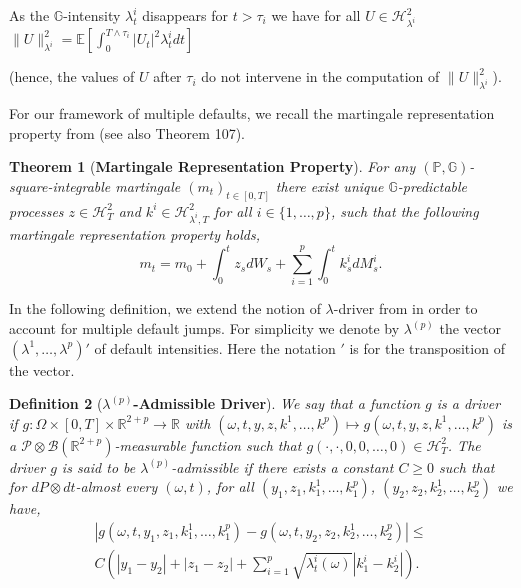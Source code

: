 \documentclass[11pt,a4paper]{article}
\numberwithin{equation}{section}
\theoremstyle{newPlain}
\newtheorem{theorem}{Theorem}[section]
\theoremstyle{newDefinition}
\newtheorem{definition}[theorem]{Definition}
\theoremstyle{newRemark}
\begin{document}
As the $\mathbb{G}$-intensity $\lambda_t^i$ disappears for $t>\tau_i$ we have for all $U\in\mathcal{H}_{\lambda^i}^2$ $\|U\|_{\lambda^i}^2=\mathbb{E}[\int_0^{T\wedge\tau_i}|U_t|^2\lambda_t^idt]$ {(hence, the values of $U$ after  $\tau_i$ do not intervene in the computation of $\|U\|_{\lambda^i}^2$).

For our framework of multiple defaults, we recall the martingale representation property from \cite{kusuoka1999remark} (see also \cite{grigorian2023enlargement} Theorem 107).

\begin{theorem}[\textbf{Martingale Representation Property}]\label{theorem:MRP}
    For any $(\mathbb{P}, \mathbb{G})$-square-integrable martingale $(m_t)_{t\in[0,T]}$ there exist unique $\mathbb{G}$-predictable processes $z\in\mathcal{H}_T^2$ and  $k^i\in\mathcal{H}_{\lambda^i,T}^2$ for all $i\in\{1,\ldots,p\}$, such that the following martingale representation property holds,
    \begin{equation}\label{eq:2-MRP}
        m_t = m_0 + \int_0^tz_sdW_s + \sum_{i=1}^p\int_0^tk_s^idM_s^i.
    \end{equation}
 
\end{theorem}

In the following definition,  we extend the notion of  $\lambda$-driver from \cite{dumitrescu2018bsdes} in order to account for multiple default jumps. For simplicity we denote by $\lambda^{(p)}$ the vector $(\lambda^1,\ldots,\lambda^p)'$ of default intensities. Here the notation $'$ is for the transposition of the vector.

\begin{definition}[\textbf{$\lambda^{(p)}$-Admissible Driver}]\label{defintion:2_LambdaDriver}
    We say that a function $g$ is a driver if $g:\Omega\times[0,T]\times\mathbb{R}^{2+p}\rightarrow\mathbb{R}$ with $(\omega, t, y, z, k^1,\ldots,k^p)\mapsto g(\omega,t,y,z,k^1,\ldots,k^p)$ is a $\mathcal{P}\otimes\mathcal{B}(\mathbb{R}^{2+p})$-measurable function such that $g(\cdot,\cdot,0,0,\ldots,0)\in\mathcal{H}_T^2$. The driver $g$ is said to be $\lambda^{(p)}$-admissible if there exists a constant $C\ge0$ such that for $dP\otimes dt$-almost every $(\omega, t)$, for all $(y_1,z_1,k_1^1,\ldots,k_1^p)$, $(y_2, z_2, k_2^1,\ldots,k_2^p)$ we have,
    \begin{multline}\label{eq:2-LAD}
        |g(\omega, t, y_1,z_1,k_1^1,\ldots,k_1^p) - g(\omega, t, y_2,z_2,k_2^1,\ldots,k_2^p)| \le\\ C\left(|y_1-y_2|+|z_1-z_2| + \sum_{i=1}^p\sqrt{\lambda_t^i(\omega)}|k_1^i-k_2^i|\right).
    \end{multline}
\end{definition}

}
\end{document}
